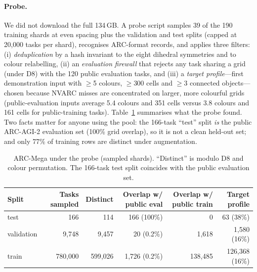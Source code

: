 \documentclass[11pt]{article}
\newcommand{\nvarc}{NVARC}
\newcommand{\mega}{ARC-Mega}
\begin{document}
\paragraph{Probe.}
We did not download the full 134\,GB. A probe script samples 39 of the 190 training shards at even spacing plus the validation and test splits (capped at 20{,}000 tasks per shard), recognises ARC-format records, and applies three filters: (i) \emph{deduplication} by a hash invariant to the eight dihedral symmetries and to colour relabelling, (ii) an \emph{evaluation firewall} that rejects any task sharing a grid (under D8) with the 120 public evaluation tasks, and (iii) a \emph{target profile}---first demonstration input with $\ge$5 colours, $\ge$300 cells and $\ge$3 connected objects---chosen because \nvarc{} misses are concentrated on larger, more colourful grids (public-evaluation inputs average 5.4 colours and 351 cells versus 3.8 colours and 161 cells for public-training tasks). Table~\ref{tab:mega} summarises what the probe found. Two facts matter for anyone using the pool: the 166-task ``test'' split \emph{is} the public ARC-AGI-2 evaluation set (100\% grid overlap), so it is not a clean held-out set; and only 77\% of training rows are distinct under augmentation.

\begin{table}[t]
\centering\small
\caption{\mega{} under the probe (sampled shards). ``Distinct'' is modulo D8 and colour permutation. The 166-task test split coincides with the public evaluation set.}
\label{tab:mega}
\begin{tabular}{lrrrrr}
\toprule
Split & Tasks sampled & Distinct & Overlap w/ public eval & Overlap w/ public train & Target profile \\
\midrule
test & 166 & 114 & 166 (100\%) & 0 & 63 (38\%) \\
validation & 9{,}748 & 9{,}457 & 20 (0.2\%) & 1{,}618 & 1{,}580 (16\%) \\
train & 780{,}000 & 599{,}026 & 1{,}726 (0.2\%) & 138{,}485 & 126{,}368 (16\%) \\
\bottomrule
\end{tabular}
\end{table}
\end{document}
